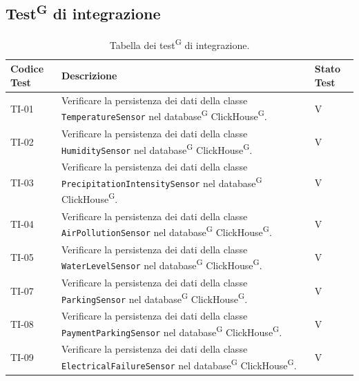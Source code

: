 \documentclass[8pt]{article}
\newcommand{\glossterm}[1]{#1\textsuperscript{G}} %
\begin{document}
\subsection{\glossterm{Test} di integrazione}\label{sec:test integrazione}
\renewcommand{\arraystretch}{2.5}
\begin{longtable}{|>{\centering}p{2cm}|>{\RaggedRight}m{12cm}|>{\centering\arraybackslash}p{2cm}|}
    \hline
    \rowcolor{white}
    \textbf{Codice Test} & \textbf{Descrizione} & \textbf{Stato Test} \\
    \hline
    \endfirsthead 
    \rowcolor{white}
    \caption{Tabella dei \glossterm{test} di integrazione.} 
    \label{table:Tabella dei test di integrazione}
    \endlastfoot 
        
    TI-01 & Verificare la persistenza dei dati della classe \verb|TemperatureSensor| nel \glossterm{database} \glossterm{ClickHouse}.  & V \\
    \hline

    TI-02 & Verificare la persistenza dei dati della classe \verb|HumiditySensor| nel \glossterm{database} \glossterm{ClickHouse}.  & V \\
    \hline
    
    TI-03 & Verificare la persistenza dei dati della classe \verb|PrecipitationIntensitySensor| nel \glossterm{database} \glossterm{ClickHouse}. & V \\
    \hline

    TI-04 & Verificare la persistenza dei dati della classe \verb|AirPollutionSensor| nel \glossterm{database} \glossterm{ClickHouse}. & V \\
    \hline

    TI-05 & Verificare la persistenza dei dati della classe \verb|WaterLevelSensor| nel \glossterm{database} \glossterm{ClickHouse}. & V \\
    \hline

    TI-07 & Verificare la persistenza dei dati della classe \verb|ParkingSensor| nel \glossterm{database} \glossterm{ClickHouse}. & V \\
    \hline 

    TI-08 & Verificare la persistenza dei dati della classe \verb|PaymentParkingSensor| nel \glossterm{database} \glossterm{ClickHouse}. & V \\
    \hline
    
    TI-09 & Verificare la persistenza dei dati della classe \verb|ElectricalFailureSensor| nel \glossterm{database} \glossterm{ClickHouse}. & V \\
    \hline


\end{longtable}
\end{document}
